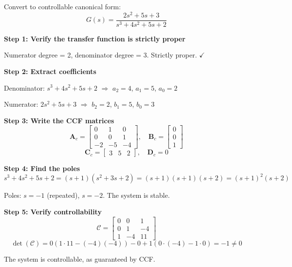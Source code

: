 \begin{example}
\label{ex:third_order_ccf}
Convert to controllable canonical form:
\begin{equation}
G(s) = \frac{2s^2 + 5s + 3}{s^3 + 4s^2 + 5s + 2}
\end{equation}

\textbf{Step 1: Verify the transfer function is strictly proper}

Numerator degree = 2, denominator degree = 3. Strictly proper. $\checkmark$

\textbf{Step 2: Extract coefficients}

Denominator: $s^3 + 4s^2 + 5s + 2$ $\Rightarrow$ $a_2 = 4$, $a_1 = 5$, $a_0 = 2$

Numerator: $2s^2 + 5s + 3$ $\Rightarrow$ $b_2 = 2$, $b_1 = 5$, $b_0 = 3$

\textbf{Step 3: Write the CCF matrices}
\begin{equation}
\mathbf{A}_c = \begin{bmatrix} 0 & 1 & 0 \\ 0 & 0 & 1 \\ -2 & -5 & -4 \end{bmatrix}, \quad \mathbf{B}_c = \begin{bmatrix} 0 \\ 0 \\ 1 \end{bmatrix}
\end{equation}
\begin{equation}
\mathbf{C}_c = \begin{bmatrix} 3 & 5 & 2 \end{bmatrix}, \quad \mathbf{D}_c = 0
\end{equation}

\textbf{Step 4: Find the poles}
\begin{equation}
s^3 + 4s^2 + 5s + 2 = (s+1)(s^2 + 3s + 2) = (s+1)(s+1)(s+2) = (s+1)^2(s+2)
\end{equation}

Poles: $s = -1$ (repeated), $s = -2$. The system is stable.

\textbf{Step 5: Verify controllability}
\begin{equation}
\mathcal{C} = \begin{bmatrix} 0 & 0 & 1 \\ 0 & 1 & -4 \\ 1 & -4 & 11 \end{bmatrix}
\end{equation}
\begin{equation}
\det(\mathcal{C}) = 0(1 \cdot 11 - (-4)(-4)) - 0 + 1(0 \cdot (-4) - 1 \cdot 0) = -1 \neq 0
\end{equation}

The system is controllable, as guaranteed by CCF.
\end{example}

